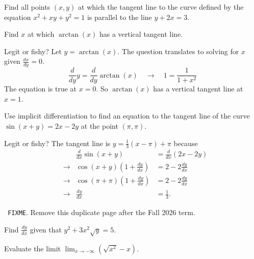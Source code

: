 \documentclass[../main.tex]{subfiles}
\begin{document}
\begin{exercise} \label{ex:tangent-parallel-to-line}
  Find all points \((x,y)\) at which the tangent line to the curve defined by the equation \(x^{2} + xy + y^{2} = 1\) is parallel to the line \(y + 2x = 3\).

  \blanks*
\end{exercise}
\clearpage

\begin{exercise}
  Find \(x\) at which \(\arctan(x)\) has a vertical tangent line.

  Legit or fishy? Let \(y = \arctan(x)\). The question translates to solving for \(x\) given \(\frac{dx}{dy} = 0\).
  \[
    \frac{d}{dy} y = \frac{d}{dy} \arctan(x)
    \quad\longrightarrow\quad
    1 = \frac{1}{1 + x^{2}}
  \]
  The equation is true at \(x = 0\). So \(\arctan(x)\) has a vertical tangent line at \(x = 1\).

  \blanks*
\end{exercise}

\begin{exercise} \label{ex:implicit-tangent-legit-or-fishy}
  Use implicit differentiation to find an equation to the tangent line of the curve \(\sin(x+y) = 2x - 2y\) at the point \((\pi, \pi)\).

  Legit or fishy? The tangent line is \(y = \frac{1}{3}(x - \pi) + \pi\) because
  \begin{align*}
    &&\frac{d}{dx} \sin(x + y) &= \frac{d}{dx}(2x - 2y) \\
    &\longrightarrow &\cos(x + y)\left(1 + \frac{dy}{dx}\right) &= 2 - 2 \frac{dy}{dx} \\
    &\longrightarrow &\cos(\pi + \pi)\left(1 + \frac{dy}{dx}\right) &= 2 - 2 \frac{dy}{dx} \\
    &\longrightarrow &\frac{dy}{dx} &= \frac{1}{3}.
  \end{align*}

  \blanks*
\end{exercise}
\clearpage

\texttt{\color{warn} FIXME}. Remove this duplicate page after the Fall 2026 term.
\clearpage

\begin{exercise}
  Find \(\frac{dy}{dx}\) given that \(y^{2} + 3x^{2}\sqrt{y} = 5\).
  
  \blanks*
\end{exercise}

\begin{exercise}
  Evaluate the limit \(\lim_{x \to -\infty} \left(\sqrt{x^{2}} - x\right)\).

\end{exercise}
\end{document}
